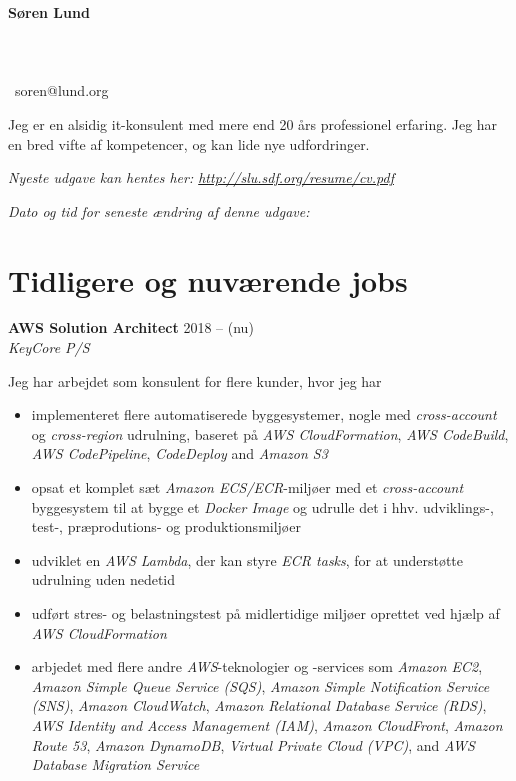 \documentclass[a4paper,11pt]{article}
\newcommand\redacted{[skjult i online version]}
\newcommand\myaddressone{\redacted}
\newcommand\myaddresstwo{\redacted}
\newcommand\myphone{\redacted}
\begin{document}
\centerline{}
\bigskip

\begin{minipage}[b]{0.30\textwidth}
  \selectfont%
  \textbf{Søren Lund} \\
  \myaddressone \\
  \myaddresstwo \\
  \myphone \\
  \Email\ soren@lund.org
\end{minipage}%
\hfill
\begin{minipage}[b]{0.30\textwidth}
  \selectfont%
  Jeg er en alsidig it-konsulent med
  mere end 20 års professionel
  erfaring. Jeg har en bred vifte af
  kompetencer, og
  kan lide nye udfordringer.
\end{minipage}

\bigskip
\centerline{\small\textit{Nyeste udgave kan hentes her: \url{http://slu.sdf.org/resume/cv.pdf}}}
\centerline{\small\textit{Dato og tid for seneste ændring af denne udgave: }}

\section*{Tidligere og nuværende jobs}

\textbf{AWS Solution Architect} \hfill 2018 -- (nu) \\
\textsl{KeyCore P/S}

Jeg har arbejdet som konsulent for flere kunder, hvor jeg har

\begin{itemize}
  \item implementeret flere automatiserede byggesystemer, nogle med
    \textit{cross-account} og \textit{cross-region} udrulning, baseret
    på \textit{AWS CloudFormation}, \textit{AWS CodeBuild},
    \textit{AWS CodePipeline}, \textit{CodeDeploy} and \textit{Amazon
      S3}
  \item opsat et komplet sæt \textit{Amazon ECS/ECR}-miljøer med et
    \textit{cross-account} byggesystem til at bygge et \textit{Docker
      Image} og udrulle det i hhv. udviklings-, test-, præprodutions-
    og produktionsmiljøer
  \item udviklet en \textit{AWS Lambda}, der kan styre \textit{ECR
    tasks}, for at understøtte udrulning uden nedetid
  \item udført stres- og belastningstest på midlertidige miljøer
    oprettet ved hjælp af \textit{AWS CloudFormation}
  \item arbjedet med flere andre \textit{AWS}-teknologier og -services
    som \textit{Amazon EC2}, \textit{Amazon Simple Queue Service
      (SQS)}, \textit{Amazon Simple Notification Service (SNS)},
    \textit{Amazon CloudWatch}, \textit{Amazon Relational Database
      Service (RDS)}, \textit{AWS Identity and Access Management
      (IAM)}, \textit{Amazon CloudFront}, \textit{Amazon Route 53},
    \textit{Amazon DynamoDB}, \textit{Virtual Private Cloud (VPC)},
    and \textit{AWS Database Migration Service}
\end{itemize}
\end{document}

